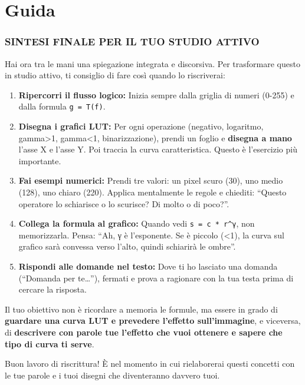 \documentclass[
]{article}
\author{}
\date{}
\providecommand{\tightlist}{%
  \setlength{\itemsep}{0pt}\setlength{\parskip}{0pt}}
\begin{document}
\hypertarget{guida}{%
\section{Guida}\label{guida}}

\hypertarget{sintesi-finale-per-il-tuo-studio-attivo}{%
\subsubsection{\texorpdfstring{\textbf{SINTESI FINALE PER IL TUO STUDIO ATTIVO}}{SINTESI FINALE PER IL TUO STUDIO ATTIVO}}\label{sintesi-finale-per-il-tuo-studio-attivo}}

Hai ora tra le mani una spiegazione integrata e discorsiva. Per trasformare questo in studio attivo, ti consiglio di fare così quando lo riscriverai:

\begin{enumerate}
\def\labelenumi{\arabic{enumi}.}
\tightlist
\item
  \textbf{Ripercorri il flusso logico:} Inizia sempre dalla griglia di numeri (0-255) e dalla formula \texttt{g\ =\ T(f)}.
\item
  \textbf{Disegna i grafici LUT:} Per ogni operazione (negativo, logaritmo, gamma\textgreater1, gamma\textless1, binarizzazione), prendi un foglio e \textbf{disegna a mano} l'asse X e l'asse Y. Poi traccia la curva caratteristica. Questo è l'esercizio più importante.
\item
  \textbf{Fai esempi numerici:} Prendi tre valori: un pixel scuro (30), uno medio (128), uno chiaro (220). Applica mentalmente le regole e chiediti: ``Questo operatore lo schiarisce o lo scurisce? Di molto o di poco?''.
\item
  \textbf{Collega la formula al grafico:} Quando vedi \texttt{s\ =\ c\ *\ r\^{}γ}, non memorizzarla. Pensa: ``Ah, γ è l'esponente. Se è piccolo (\textless1), la curva sul grafico sarà convessa verso l'alto, quindi schiarirà le ombre''.
\item
  \textbf{Rispondi alle domande nel testo:} Dove ti ho lasciato una domanda (``Domanda per te\ldots{}''), fermati e prova a ragionare con la tua testa prima di cercare la risposta.
\end{enumerate}

Il tuo obiettivo non è ricordare a memoria le formule, ma essere in grado di \textbf{guardare una curva LUT e prevedere l'effetto sull'immagine}, e viceversa, di \textbf{descrivere con parole tue l'effetto che vuoi ottenere e sapere che tipo di curva ti serve}.

Buon lavoro di riscrittura! È nel momento in cui rielaborerai questi concetti con le tue parole e i tuoi disegni che diventeranno davvero tuoi.
\end{document}
